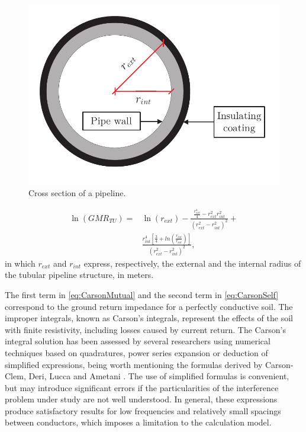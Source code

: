 \documentclass[conference]{IEEEtran}
\begin{document}
	\begin{figure}[!t]
		\begin{center}
			\includegraphics[width=.8\columnwidth]{fig/Pipe2.pdf}
			\caption{Cross section of a pipeline.}
			\label{fig:Pipe}
		\end{center}
	\end{figure}
	\begin{equation}\label{eq:GMR}
		\begin{aligned}
			\ln(GMR_{TU})=&\ln(r_{ext})-\frac{\frac{r_{ext}^4}{4}-r_{ext}^2r_{int}^2}{(r_{ext}^2-r_{int}^2)^2}+ \\
			&\frac{r_{int}^4[\frac{3}{4}+ln(\frac{r_{int}}{r_{int}})]}{(r_{ext}^2-r_{int}^2)^2},
		\end{aligned}
	\end{equation}
	in which $r_{ext}$ and $r_{int}$ express, respectively, the external and the internal radius of the tubular pipeline structure, in meters.
	
	The first term in \eqref{eq:CarsonMutual} and the second term in \eqref{eq:CarsonSelf} correspond to the ground return impedance for a perfectly conductive soil. The improper integrals, known as Carson's integrals, represent the effects of the soil with finite resistivity, including losses caused by current return. The Carson's integral solution has been assessed by several researchers using numerical techniques based on quadratures, power series expansion or deduction of simplified expressions, being worth mentioning the formulas derived by Carson-Clem, Deri, Lucca and Ametani \cite{CIGREWG36,DeriA.Tevan1981,Lucca1994,Ametani2009}. The use of simplified formulas is convenient, but may introduce significant errors if the particularities of the interference problem under study are not well understood. In general, these expressions produce satisfactory results for low frequencies and relatively small spacings between conductors, which imposes a limitation to the calculation model.
	
\end{document}
